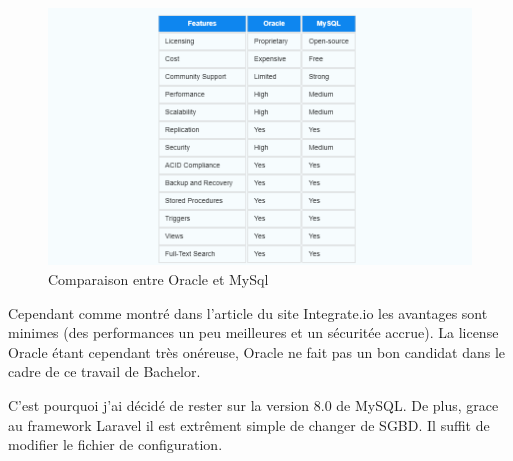\begin{center}
  \begin{figure}[H]%
    \includegraphics[width=\textwidth]{./assets/figures/OracleVsMySql.png}
    \caption{Comparaison entre Oracle et MySql \label{OracleVsMySql.png}}
  \end{figure}
\end{center}
Cependant comme montré dans l'article du site Integrate.io \cite{Integrate.io} les avantages sont minimes (des performances un peu meilleures et un sécuritée accrue). La license Oracle étant cependant très onéreuse, Oracle ne fait pas un bon candidat dans le cadre de ce travail de Bachelor.

C'est pourquoi j'ai décidé de rester sur la version 8.0 de MySQL. De plus, grace au framework Laravel il est extrêment simple de changer de SGBD. Il suffit de modifier le fichier de configuration.

